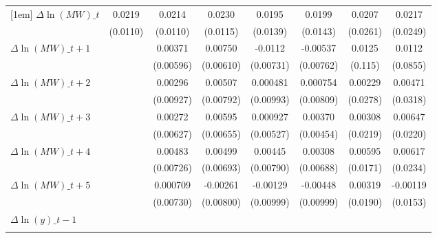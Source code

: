 {\begin{tabular}{l*{7}{c}}
[1em]
$\Delta \ln(MW)\_{t}$&   0.0219\sym{*}  &   0.0214\sym{*}  &   0.0230\sym{*}  &   0.0195         &   0.0199         &   0.0207         &   0.0217         \\
          & (0.0110)         & (0.0110)         & (0.0115)         & (0.0139)         & (0.0143)         & (0.0261)         & (0.0249)         \\
[1em]
$\Delta \ln(MW)\_{t+1}$&                  &  0.00371         &  0.00750         &  -0.0112         & -0.00537         &   0.0125         &   0.0112         \\
          &                  &(0.00596)         &(0.00610)         &(0.00731)         &(0.00762)         &  (0.115)         & (0.0855)         \\
[1em]
$\Delta \ln(MW)\_{t+2}$&                  &  0.00296         &  0.00507         & 0.000481         & 0.000754         &  0.00229         &  0.00471         \\
          &                  &(0.00927)         &(0.00792)         &(0.00993)         &(0.00809)         & (0.0278)         & (0.0318)         \\
[1em]
$\Delta \ln(MW)\_{t+3}$&                  &  0.00272         &  0.00595         & 0.000927         &  0.00370         &  0.00308         &  0.00647         \\
          &                  &(0.00627)         &(0.00655)         &(0.00527)         &(0.00454)         & (0.0219)         & (0.0220)         \\
[1em]
$\Delta \ln(MW)\_{t+4}$&                  &  0.00483         &  0.00499         &  0.00445         &  0.00308         &  0.00595         &  0.00617         \\
          &                  &(0.00726)         &(0.00693)         &(0.00790)         &(0.00688)         & (0.0171)         & (0.0234)         \\
[1em]
$\Delta \ln(MW)\_{t+5}$&                  & 0.000709         & -0.00261         & -0.00129         & -0.00448         &  0.00319         & -0.00119         \\
          &                  &(0.00730)         &(0.00800)         &(0.00999)         &(0.00999)         & (0.0190)         & (0.0153)         \\
[1em]
$\Delta \ln(y)\_{t-1}$&                  &                  &                  &                  &                  &                  &                  \\
          &                  &                  &                  &                  &                  &                  &                  \\

\end{tabular}}
